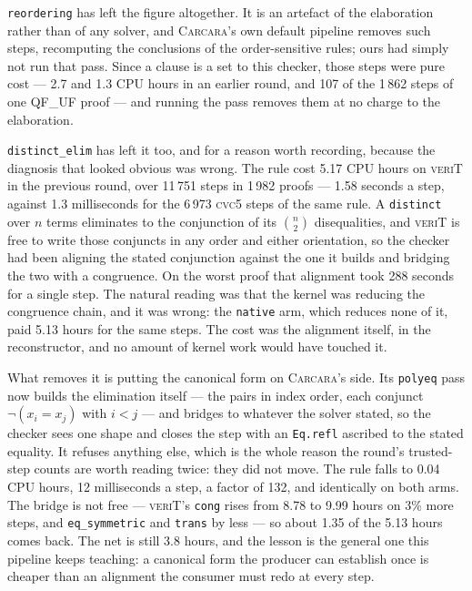\documentclass[runningheads]{llncs}
\newcommand{\cvcv}{\textsc{cvc5}\xspace}
\newcommand{\carcara}{\textsc{Carcara}\xspace}
\newcommand{\verit}{\textsc{veriT}\xspace}
\newcommand{\rulename}[1]{\texttt{#1}}
\begin{document}
\rulename{reordering} has left the figure altogether. It is an artefact of the
elaboration rather than of any solver, and \carcara's own default pipeline
removes such steps, recomputing the conclusions of the order-sensitive rules;
ours had simply not run that pass. Since a clause is a set to this checker,
those steps were pure cost --- 2.7 and 1.3 CPU hours in an earlier round, and
107 of the 1\,862 steps of one QF\_UF proof --- and running the pass removes
them at no charge to the elaboration.

\rulename{distinct\_elim} has left it too, and for a reason worth recording,
because the diagnosis that looked obvious was wrong. The rule cost 5.17 CPU
hours on \verit in the previous round, over 11\,751 steps in 1\,982 proofs ---
1.58 seconds a step, against 1.3 milliseconds for the 6\,973 \cvcv steps of the
same rule. A \lstinline{distinct} over $n$ terms eliminates to the conjunction
of its $\binom{n}{2}$ disequalities, and \verit is free to write those
conjuncts in any order and either orientation, so the checker had been aligning
the stated conjunction against the one it builds and bridging the two with a
congruence. On the worst proof that alignment took 288 seconds for a single
step. The natural reading was that the kernel was reducing the congruence
chain, and it was wrong: the \texttt{native} arm, which reduces none of it,
paid 5.13 hours for the same steps. The cost was the alignment itself, in the
reconstructor, and no amount of kernel work would have touched it.

What removes it is putting the canonical form on \carcara's side. Its
\texttt{polyeq} pass now builds the elimination itself --- the pairs in index
order, each conjunct $\neg(x_i = x_j)$ with $i < j$ --- and bridges to whatever
the solver stated, so the checker sees one shape and closes the step with an
\lstinline{Eq.refl} ascribed to the stated equality. It refuses anything else,
which is the whole reason the round's trusted-step counts are worth reading
twice: they did not move. The rule falls to 0.04 CPU hours, 12 milliseconds a
step, a factor of 132, and identically on both arms. The bridge is not free ---
\verit's \rulename{cong} rises from 8.78 to 9.99 hours on 3\% more steps, and
\rulename{eq\_symmetric} and \rulename{trans} by less --- so about 1.35 of the
5.13 hours comes back. The net is still 3.8 hours, and the lesson is the
general one this pipeline keeps teaching: a canonical form the producer can
establish once is cheaper than an alignment the consumer must redo at every
step.
\end{document}
